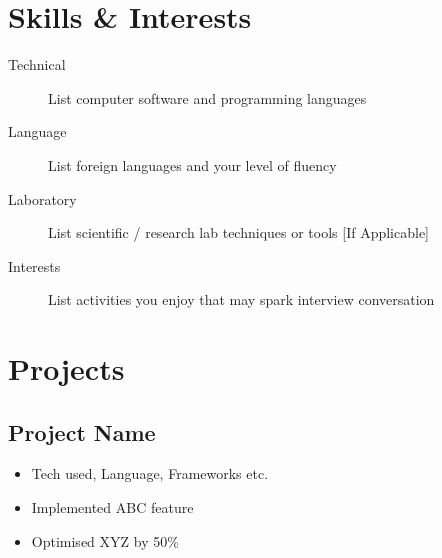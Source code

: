 \documentclass[11pt]{article}
\begin{document}
\section{Skills \& Interests}
\begin{description}
	\item[Technical] List computer software and programming languages
	\item[Language] List foreign languages and your level of fluency
	\item[Laboratory] List scientific / research lab techniques or tools [If Applicable]
	\item[Interests] List activities you enjoy that may spark interview conversation
\end{description}


\section{Projects}
\subsection{Project Name  }
\begin{itemize}
  \item Tech used, Language, Frameworks etc.
  \item Implemented ABC feature
  \item Optimised XYZ by 50\%
\end{itemize}
\end{document}
